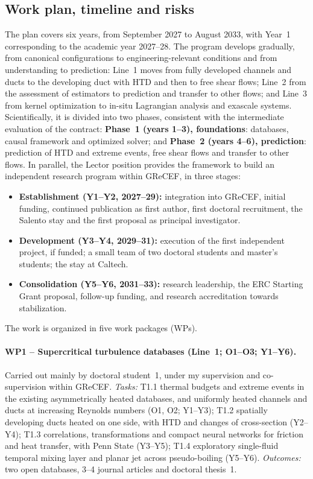 \documentclass[11pt]{article}
\begin{document}
\subsection{Work plan, timeline and risks}\label{sec:workplan}
The plan covers six years, from September 2027 to August 2033, with Year~1 corresponding to
the academic year 2027--28. The program develops gradually, from canonical configurations to
engineering-relevant conditions and from understanding to prediction: Line~1 moves from fully
developed channels and ducts to the developing duct with HTD and then to free shear flows;
Line~2 from the assessment of estimators to prediction and transfer to other flows; and Line~3
from kernel optimization to in-situ Lagrangian analysis and exascale systems. Scientifically, it is divided into two phases, consistent with the
intermediate evaluation of the contract: \textbf{Phase~1 (years 1--3), foundations}:
databases, causal framework and optimized solver; and \textbf{Phase~2 (years 4--6),
prediction}: prediction of HTD and extreme events, free shear flows and transfer to other
flows. In parallel, the Lector position
provides the framework to build an independent research program within GReCEF, in three
stages:
\begin{itemize}
  \item \textbf{Establishment (Y1--Y2, 2027--29):} integration into GReCEF, initial funding,
  continued publication as first author, first doctoral recruitment, the Salento stay and the first proposal as principal
  investigator.
  \item \textbf{Development (Y3--Y4, 2029--31):} execution of the first independent project,
  if funded; a small team of two doctoral students and master's students; the stay at
  Caltech.
  \item \textbf{Consolidation (Y5--Y6, 2031--33):} research leadership, the ERC Starting Grant
  proposal, follow-up funding, and research accreditation towards stabilization.
\end{itemize}
The work is organized in five work packages (WPs).

\paragraph{WP1 -- Supercritical turbulence databases (Line~1; O1--O3; Y1--Y6).} Carried out
mainly by doctoral student~1, under my supervision and co-supervision within GReCEF.
\emph{Tasks:} T1.1 thermal budgets and extreme events in the existing asymmetrically heated
databases, and uniformly heated channels and ducts at increasing Reynolds numbers (O1, O2;
Y1--Y3); T1.2 spatially developing ducts heated on one side, with HTD and changes of cross-section (Y2--Y4); T1.3 correlations, transformations
and compact neural networks for friction and heat transfer, with Penn State (Y3--Y5); T1.4
exploratory single-fluid temporal mixing layer and planar jet across pseudo-boiling (Y5--Y6).
\emph{Outcomes:} two open databases, 3--4 journal articles and doctoral thesis~1.
\end{document}
